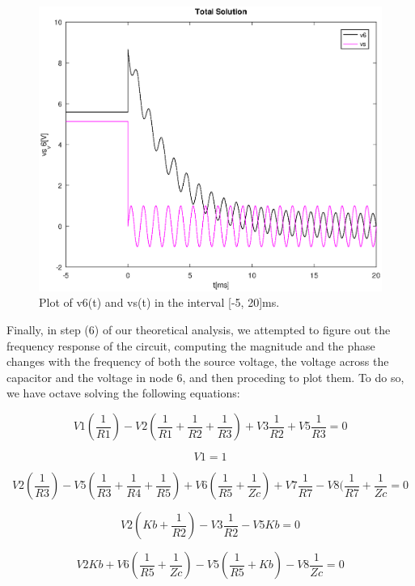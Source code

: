 \begin{figure}[h] \centering
\includegraphics[width=0.8\linewidth]{TotalSolution.eps}
\caption{Plot of v6(t) and vs(t) in the interval [-5, 20]ms.}
\label{fig:plotA(5)}
\end{figure}

Finally, in step (6) of our theoretical analysis, we attempted to figure out the frequency response of the circuit, computing the magnitude and the phase changes with the frequency of both the source voltage, the voltage across the capacitor and the voltage in node 6, and then proceding to plot them.
To do so, we have octave solving the following equations:

\begin{equation}
  V1(\frac{1}{R1}) - V2(\frac{1}{R1}+\frac{1}{R2}+\frac{1}{R3})  + V3\frac{1}{R2} + V5\frac{1}{R3} = 0
\end{equation}

\begin{equation}
  V1 = 1
\end{equation}

\begin{equation}
  V2(\frac{1}{R3}) - V5(\frac{1}{R3}+\frac{1}{R4}+\frac{1}{R5})  + V6(\frac{1}{R5} + \frac{1}{Zc} ) + V7\frac{1}{R7} - V8(\frac{1}{R7} + \frac{1}{Zc} = 0
\end{equation}

\begin{equation}
  V2(Kb+\frac{1}{R2}) -V3\frac{1}{R2} - V5Kb = 0
\end{equation}

\begin{equation}
  V2Kb  + V6(\frac{1}{R5}+\frac{1}{Zc}) - V5(\frac{1}{R5} + Kb) - V8\frac{1}{Zc} = 0
\end{equation}


